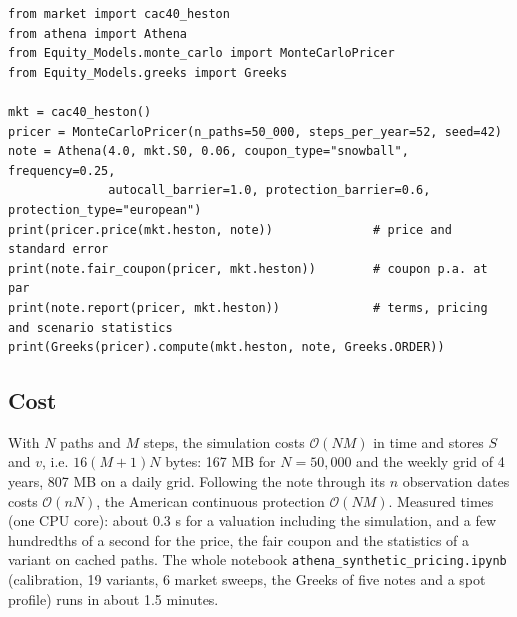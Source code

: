 \documentclass[11pt,a4paper]{article}
\newcommand{\code}[1]{\texttt{#1}}
\begin{document}
\begin{lstlisting}
from market import cac40_heston
from athena import Athena
from Equity_Models.monte_carlo import MonteCarloPricer
from Equity_Models.greeks import Greeks

mkt = cac40_heston()
pricer = MonteCarloPricer(n_paths=50_000, steps_per_year=52, seed=42)
note = Athena(4.0, mkt.S0, 0.06, coupon_type="snowball", frequency=0.25,
              autocall_barrier=1.0, protection_barrier=0.6, protection_type="european")
print(pricer.price(mkt.heston, note))              # price and standard error
print(note.fair_coupon(pricer, mkt.heston))        # coupon p.a. at par
print(note.report(pricer, mkt.heston))             # terms, pricing and scenario statistics
print(Greeks(pricer).compute(mkt.heston, note, Greeks.ORDER))
\end{lstlisting}

\subsection{Cost}
With $N$ paths and $M$ steps, the simulation costs $\mathcal{O}(NM)$ in time and stores $S$ and $v$, i.e.
$16(M+1)N$ bytes: 167 MB for $N = 50{,}000$ and the weekly grid of 4 years, 807 MB on a daily grid. Following the
note through its $n$ observation dates costs $\mathcal{O}(nN)$, the American continuous protection
$\mathcal{O}(NM)$. Measured times (one CPU core): about 0.3 s for a valuation including the simulation, and a few hundredths of
a second for the price, the fair coupon and the statistics of a variant on cached paths. The whole notebook
\code{athena\_synthetic\_pricing.ipynb} (calibration, 19 variants, 6 market sweeps, the Greeks of five notes and a
spot profile) runs in about 1.5 minutes.

\end{document}
